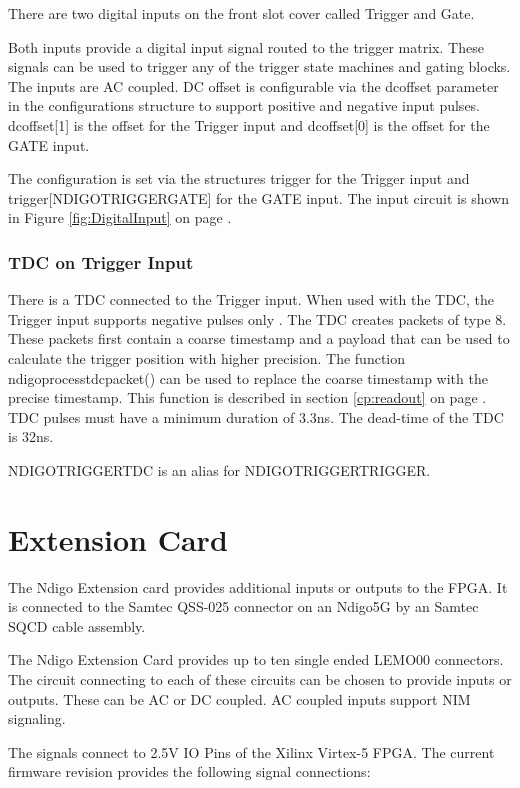 		There are two digital inputs on the front slot cover called Trigger and Gate.\par
		Both inputs provide a digital input signal routed to the trigger matrix. These signals can be used to trigger any of the trigger state machines and gating blocks. The inputs are AC coupled. DC offset is configurable via the \textsf{dc\tu offset} parameter in the configurations structure to support positive and negative input pulses. \textsf{dc\tu offset[1]} is the offset for the Trigger input and \textsf{dc\tu offset[0]} is the offset for the GATE input.\par
		The configuration is set via the structures \textsf{trigger} for the Trigger input and \textsf{trigger[NDIGO\tu TRIGGER\tu GATE]} for the GATE input. The input circuit is shown in Figure \ref{fig:DigitalInput} on page \pageref{fig:DigitalInput}.
		
		\subsubsection{TDC on Trigger Input}
		
			There is a TDC connected to the Trigger input. When used with the TDC, the Trigger input supports negative pulses only . The TDC creates packets of type 8. These packets first contain a coarse timestamp and a payload that can be used to calculate the trigger position with higher precision. The function \textsf{ndigo\tu process\tu tdc\tu packet()} can be used to replace the coarse timestamp with the precise timestamp. This function is described in section \ref{cp:readout} on page \pageref{cp:readout}.
			TDC pulses must have a minimum duration of 3.3ns. The dead-time of the TDC is 32ns.

			\textsf{NDIGO\tu TRIGGER\tu TDC} is an alias for \textsf{NDIGO\tu TRIGGER\tu TRIGGER}.


\section{Extension Card\label{cp:extcard}}

	The Ndigo Extension card provides additional inputs or outputs to the FPGA. It is connected to the Samtec QSS-025 connector on an Ndigo5G by an Samtec SQCD cable assembly.\par
	The Ndigo Extension Card provides up to ten single ended LEMO00 connectors. The circuit connecting to each of these circuits can be chosen to provide inputs or outputs. These can be AC or DC coupled. AC coupled inputs support NIM signaling.\par 
	The signals connect to 2.5V IO Pins of the Xilinx Virtex-5 FPGA. The current firmware revision provides the following signal connections:\par
	
